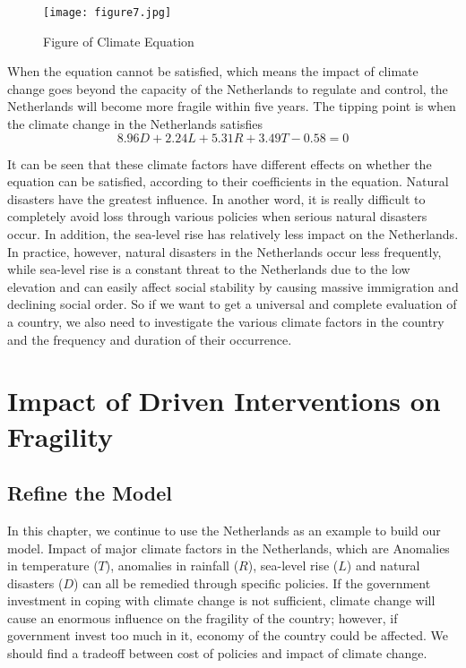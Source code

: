 \documentclass{mcmthesis}
\begin{document}
	\begin{figure}[h]
		\small
		\centering
		\texttt{[image: figure7.jpg]}
		\caption{Figure of Climate Equation} \label{fig:Figure of Climate Equation}
	\end{figure}
	
	When the equation cannot be satisfied, which means the impact of climate change goes beyond the capacity of the Netherlands to regulate and control, the Netherlands will become more fragile within five years.
	The tipping point is when the climate change in the Netherlands satisfies
	$$
	8.96D + 2.24L + 5.31R + 3.49T - 0.58 = 0
	$$
	
	
	It can be seen that these climate factors have different effects on whether the equation can be satisfied, according to their coefficients in the equation. Natural disasters have the greatest influence. In another word, it is really difficult to completely avoid loss through various policies when serious natural disasters occur. In addition,  the sea-level rise has relatively less impact on the Netherlands. In practice, however, natural disasters in the Netherlands occur less frequently, while sea-level rise is a constant threat to the Netherlands due to the low elevation and can easily affect social stability by causing massive immigration and declining social order. So if we want to get a universal and complete evaluation of a country, we also need to investigate the various climate factors in the country and the frequency and duration of their occurrence.
	
	\section{Impact of Driven Interventions on Fragility}
	\subsection{Refine the Model}
	In this chapter, we continue to use the Netherlands as an example to build our model. Impact of major climate factors in the Netherlands, which are Anomalies in temperature ($T$), anomalies in rainfall ($R$), sea-level rise ($L$) and natural disasters ($D$) can all be remedied through specific policies. If the government investment in coping with climate change is not sufficient, climate change will cause an enormous influence on the fragility of the country; however, if government invest too much in it, economy of the country could be affected. We should find a tradeoff between cost of policies and impact of climate change. 
	
\end{document}

